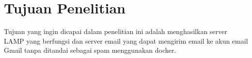 \documentclass[./bab_1.tex]{subfiles}
\begin{document}
\section{Tujuan Penelitian}
\paragraph*{} Tujuan yang ingin dicapai dalam penelitian ini
adalah menghasilkan server LAMP yang berfungsi dan server
email yang dapat mengirim email ke akun email Gmail tanpa
ditandai sebagai spam menggunakan docker.
\end{document}
